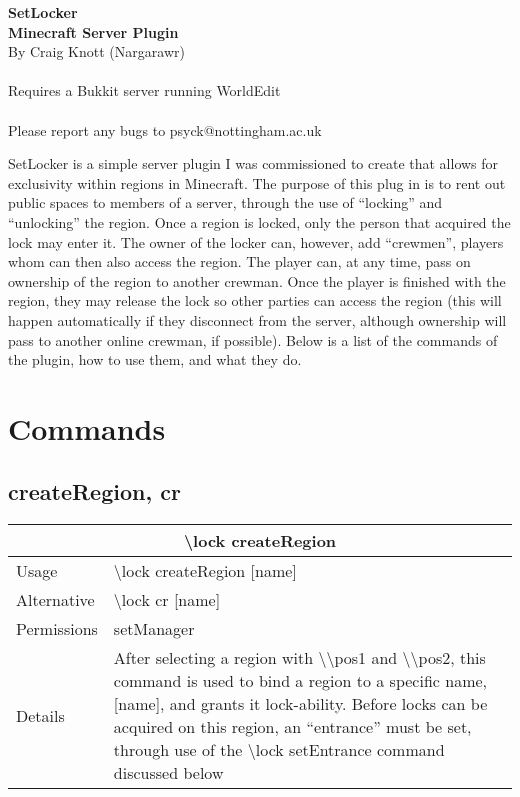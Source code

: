 \documentclass[a4paper,twoside,notitlepage,11pt]{article}
\newcommand{\nin}{\noindent}
\begin{document}
\begin{center}
   \textbf{SetLocker\ \\Minecraft Server Plugin} \ \\
   By Craig Knott (Nargarawr) \ \\
   \ \\
   Requires a Bukkit server running WorldEdit\ \\
   \ \\
   Please report any bugs to psyck@nottingham.ac.uk
\end{center}
\nin
SetLocker is a simple server plugin I was commissioned to create that allows for exclusivity within regions in Minecraft. The purpose of this plug in is to rent out public spaces to members of a server, through the use of ``locking'' and ``unlocking'' the region. Once a region is locked, only the person that acquired the lock may enter it. The owner of the locker can, however, add ``crewmen'', players whom can then also access the region. The player can, at any time, pass on ownership of the region to another crewman. Once the player is finished with the region, they may release the lock so other parties can access the region (this will happen automatically if they disconnect from the server, although ownership will pass to another online crewman, if possible). Below is a list of the commands of the plugin, how to use them, and what they do.

\tableofcontents

\newpage
\pagestyle{plain}

\section{Commands}
\subsection{createRegion, cr}
\begin{center}
\begin{tabular}{|p{2cm}|p{12.5cm}|} \hline
\multicolumn{2}{|c|}{\textbf{\textbackslash lock createRegion}} \\ \hline
Usage       & \textbackslash lock createRegion [name] \\ \hline
Alternative & \textbackslash lock cr [name] \\ \hline
Permissions & setManager \\ \hline
Details 	& After selecting a region with \textbackslash\textbackslash pos1 and \textbackslash\textbackslash pos2, this command is used to bind a region to a specific name, [name], and grants it lock-ability. Before locks can be acquired on this region, an ``entrance'' must be set, through use of the \textbackslash lock setEntrance command discussed below\\ \hline
\end{tabular}
\end{center}
\end{document}
